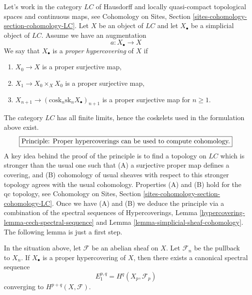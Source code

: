 \noindent
Let's work in the category $\textit{LC}$ of Hausdorff and locally
quasi-compact topological spaces and continuous maps, see
Cohomology on Sites, Section \ref{sites-cohomology-section-cohomology-LC}.
Let $X$ be an object of $\textit{LC}$ and let $X_\bullet$ be a simplicial
object of $\textit{LC}$. Assume we have an augmentation
$$
a : X_\bullet \to X
$$
We say that $X_\bullet$ is a {\it proper hypercovering} of $X$ if
\begin{enumerate}
\item $X_0 \to X$ is a proper surjective map,
\item $X_1 \to X_0 \times_X X_0$ is a proper surjective map,
\item $X_{n + 1} \to (\text{cosk}_n\text{sk}_n X_\bullet)_{n + 1}$
is a proper surjective map for $n \geq 1$.
\end{enumerate}
The category $\textit{LC}$ has all finite limits, hence the
coskelets used in the formulation above exist.
$$
\fbox{Principle: Proper hypercoverings can be used to compute cohomology.}
$$
A key idea behind the proof of the principle is to find a topology
on $\textit{LC}$ which is stronger than the usual one such that
(A) a surjective proper map defines a covering, and
(B) cohomology of usual sheaves with respect to this stronger
topology agrees with the usual cohomology.
Properties (A) and (B) hold for the qc topology, see
Cohomology on Sites, Section \ref{sites-cohomology-section-cohomology-LC}.
Once we have (A) and (B) we deduce the principle via
a combination of the spectral sequences of
Hypercoverings, Lemma \ref{hypercovering-lemma-cech-spectral-sequence}
and
Lemma \ref{lemma-simplicial-sheaf-cohomology}.
The following lemma is just a first step.

\begin{lemma}
\label{lemma-spectral-sequence-proper-hypercovering}
In the situation above, let $\mathcal{F}$ be an abelian sheaf
on $X$. Let $\mathcal{F}_n$ be the pullback to $X_n$.
If $X_\bullet$ is a proper hypercovering of $X$, then
there exists a canonical spectral sequence
$$
E_1^{p, q} = H^q(X_p, \mathcal{F}_p)
$$
converging to $H^{p + q}(X, \mathcal{F})$.
\end{lemma}

